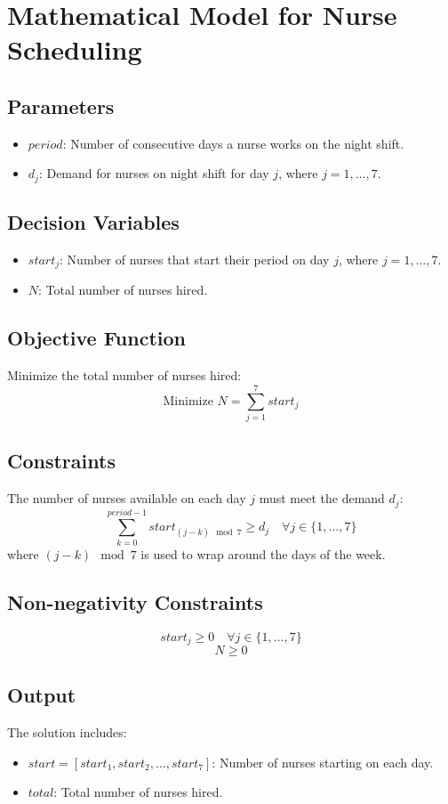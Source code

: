 \documentclass{article}
\begin{document}
\section*{Mathematical Model for Nurse Scheduling}

\subsection*{Parameters}
\begin{itemize}
    \item $period$: Number of consecutive days a nurse works on the night shift.
    \item $d_j$: Demand for nurses on night shift for day $j$, where $j = 1, \ldots, 7$.
\end{itemize}

\subsection*{Decision Variables}
\begin{itemize}
    \item $start_j$: Number of nurses that start their period on day $j$, where $j = 1, \ldots, 7$.
    \item $N$: Total number of nurses hired.
\end{itemize}

\subsection*{Objective Function}
Minimize the total number of nurses hired:
\[
\text{Minimize } N = \sum_{j=1}^{7} start_j
\]

\subsection*{Constraints}
The number of nurses available on each day $j$ must meet the demand $d_j$:
\[
\sum_{k=0}^{period-1} start_{(j-k) \mod 7} \geq d_j \quad \forall j \in \{1, \ldots, 7\}
\]
where $(j-k) \mod 7$ is used to wrap around the days of the week.

\subsection*{Non-negativity Constraints}
\[
start_j \geq 0 \quad \forall j \in \{1, \ldots, 7\}
\]
\[
N \geq 0
\]

\subsection*{Output}
The solution includes:
\begin{itemize}
    \item $start = [start_1, start_2, \ldots, start_7]$: Number of nurses starting on each day.
    \item $total$: Total number of nurses hired.
\end{itemize}
\end{document}
